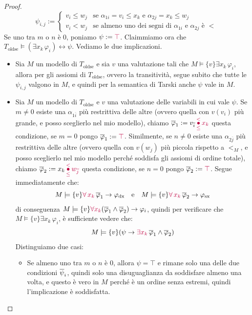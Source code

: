 \begin{proof}
    \[ \psi_{i,j} := \begin{cases}
        v_i \leq w_j & \text{se $\alpha_{1i} = v_i \leq x_k$ e $\alpha_{2j} = x_k \leq w_j$}\\
        v_i < w_j & \text{se almeno uno dei segni di $\alpha_{1i}$ e $\alpha_{2j}$ è $<$}
    \end{cases}
    \]
    Se uno tra $m$ o $n$ è 0, poniamo $\psi := \textcolor{purple}{\top}$. Claimmiamo ora che $T_{\text{oldse}} \models (\exists x_k \, \varphi_i) \leftrightarrow \psi$. Vediamo le due implicazioni.
    \begin{itemize}
        \item[$\boxed{\to}$] Sia $M$ un modello di $T_{\text{oldse}}$ e sia $v$ una valutazione tali che $M \models \{v\} \exists x_k \, \varphi_i$, allora per gli assiomi di $T_{\text{oldse}}$, ovvero la transitività, segue subito che tutte le $\psi_{i,j}$ valgono in $M$, e quindi per la semantica di Tarski anche $\psi$ vale in $M$.
        \item[$\boxed{\leftarrow}$] Sia $M$ un modello di $T_{\text{oldse}}$ e $v$ una valutazione delle variabili in cui vale $\psi$. Se $m \ne 0$ esiste una $\alpha_{1\overline i}$ più restrittiva delle altre (ovvero quella con $v(v_i)$ più grande, e posso sceglierlo nel mio modello), chiamo $\overline \varphi_1 := v_{\overline i} \,\textcolor{purple}{\underset{\leq}{\overset{<}{\bullet}}\, x_k}$ questa condizione,
        se $m = 0$ pongo $\overline \varphi_1 := \textcolor{purple}{\top}$. Similmente, se $n \ne 0$ esiste una $\alpha_{2\overline j}$ più restrittiva delle altre (ovvero quella con $v(w_j)$ più piccola rispetto a $<_M$, e posso sceglierlo nel mio modello perché soddisfa gli assiomi di ordine totale), chiamo $\overline \varphi_2 := x_k \,\textcolor{purple}{\underset{\leq}{\overset{<}{\bullet}}\, w_{\overline j}}$ questa condizione,
        se $n = 0$ pongo $\overline \varphi_2 := \textcolor{purple}{\top}$. Segue immediatamente che:
        \[ M \models \{v\} \textcolor{purple}{\forall \, x_k}\, \overline{\varphi}_1 \to \varphi_{\text{dx}} \quad \text{e} \quad M \models \{v\} \textcolor{purple}{\forall \, x_k}\, \overline{\varphi}_2 \to \varphi_{\text{sx}}
        \]
        di conseguenza $M \models \{v\} \textcolor{purple}{\forall x_k} (\overline{\varphi}_1 \land \overline{\varphi}_2) \to \varphi_i$, quindi per verificare che $M \models \{v\} \exists x_k \, \varphi_i$, è sufficiente vedere che:
        \[ M \models \{v\}( \psi \to \textcolor{purple}{\exists x_k} \, \overline{\varphi}_1 \land \overline{\varphi}_2)
        \]
        Distinguiamo due casi:
        \begin{itemize}
            \item Se almeno uno tra $m$ o $n$ è 0, allora $\psi = \top$ e rimane solo una delle due condizioni $\overline \psi_i$, quindi solo una disuguaglianza da soddisfare almeno una volta, e questo è vero in $M$ perché è un ordine senza estremi, quindi l'implicazione è soddisfatta.

\end{itemize}
\end{itemize}
\end{proof}
